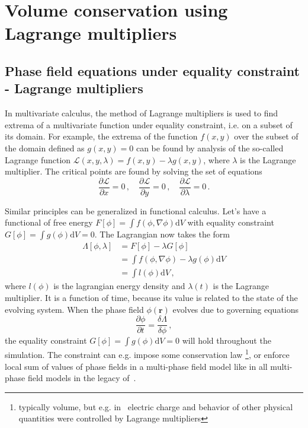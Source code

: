 \chapter{Volume conservation using Lagrange multipliers} \label{ch_lagrange_multipliers_PF}
\section*{Phase field equations under equality constraint - Lagrange multipliers} \label{sec_apdx_Lagrmult}
In multivariate calculus, the method of Lagrange multipliers is used to find extrema of a multivariate function under equality constraint, i.e. on a subset of its domain. For example, the extrema of the function $f(x,y)$ over the subset of the domain defined as $g(x,y)=0$ can be found by analysis of the so-called Lagrange function $\mathcal{L}(x,y,\lambda)=f(x,y)-\lambda g(x,y)$, where $\lambda$ is the Lagrange multiplier. The critical points are found by solving the set of equations
\begin{equation}
\frac{\partial \mathcal{L}}{\partial x}=0 \,,\quad \frac{\partial \mathcal{L}}{\partial y}=0 \,,\quad    \frac{\partial \mathcal{L}}{\partial \lambda}=0 \,.
\end{equation}

Similar principles can be generalized in functional calculus. Let's have a functional of free energy $F[\phi] = \int f(\phi,\nabla\phi) \mathrm{d}V$ with equality constraint $G[\phi]=\int g(\phi)\mathrm{d}V=0$. The Lagrangian now takes the form
\begin{align}
\Lambda[\phi,\lambda]&= F[\phi] - \lambda
G[\phi] \\
&= \int f(\phi,\nabla\phi) - \lambda g(\phi)\mathrm{d}V \\
&= \int l(\phi) \mathrm{d}V \,,
\end{align}
where $l(\phi)$ is the lagrangian energy density and $\lambda(t)$ is the Lagrange multiplier. It is a function of time, because its value is related to the state of the evolving system. When the phase field $\phi(\bm{r})$ evolves due to governing equations 
\begin{equation}
\frac{\partial \phi}{\partial t} = \frac{\delta \Lambda}{\delta \phi}\,,
\end{equation}
the equality constraint $G[\phi]=\int g(\phi)\mathrm{d}V=0$ will hold throughout the simulation. The constraint can e.g. impose some conservation law \footnote{typically volume, but e.g. in~\cite{Guyer2004a,Guyer2004b} electric charge and behavior of other physical quantities were controlled by Lagrange multipliers}, or enforce local sum of values of phase fields in a multi-phase field model like in all multi-phase field models in the legacy of~\cite{Steinbach1996}.

